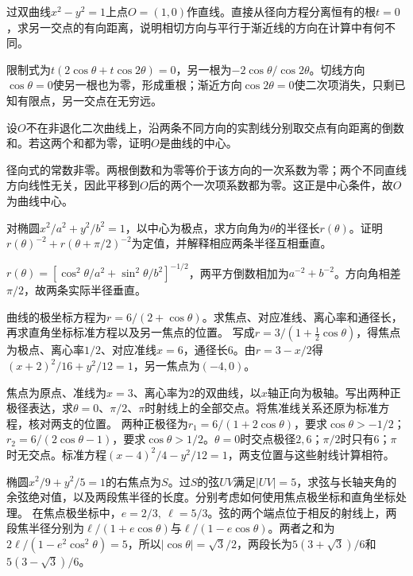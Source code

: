 过双曲线\(x^2-y^2=1\)上点\(O=(1,0)\)作直线。直接从径向方程分离恒有的根\(t=0\)，求另一交点的有向距离，说明相切方向与平行于渐近线的方向在计算中有何不同。
\par
\solutionanswer
限制式为\(t(2\cos\theta+t\cos2\theta)=0\)，另一根为\(-2\cos\theta/\cos2\theta\)。切线方向\(\cos\theta=0\)使另一根也为零，形成重根；渐近方向\(\cos2\theta=0\)使二次项消失，只剩已知有限点，另一交点在无穷远。


设\(O\)不在非退化二次曲线上，沿两条不同方向的实割线分别取交点有向距离的倒数和。若这两个和都为零，证明\(O\)是曲线的中心。
\par
\solutionanswer
径向式的常数非零。两根倒数和为零等价于该方向的一次系数为零；两个不同直线方向线性无关，因此平移到\(O\)后的两个一次项系数都为零。这正是中心条件，故\(O\)为曲线中心。


对椭圆\(x^2/a^2+y^2/b^2=1\)，以中心为极点，求方向角为\(\theta\)的半径长\(r(\theta)\)。证明\(r(\theta)^{-2}+r(\theta+\pi/2)^{-2}\)为定值，并解释相应两条半径互相垂直。
\par
\solutionanswer
\(r(\theta)=[\cos^2\theta/a^2+\sin^2\theta/b^2]^{-1/2}\)，两平方倒数相加为\(a^{-2}+b^{-2}\)。方向角相差\(\pi/2\)，故两条实际半径垂直。


曲线的极坐标方程为\(r=6/(2+\cos\theta)\)。求焦点、对应准线、离心率和通径长，再求直角坐标标准方程以及另一焦点的位置。
\solutionanswer
写成\(r=3/(1+\frac12\cos\theta)\)，得焦点为极点、离心率\(1/2\)、对应准线\(x=6\)，通径长\(6\)。由\(r=3-x/2\)得\((x+2)^2/16+y^2/12=1\)，另一焦点为\((-4,0)\)。


焦点为原点、准线为\(x=3\)、离心率为\(2\)的双曲线，以\(x\)轴正向为极轴。写出两种正极径表达，求\(\theta=0\)、\(\pi/2\)、\(\pi\)时射线上的全部交点。将焦准线关系还原为标准方程，核对两支的位置。
\solutionanswer
两种正极径为\(r_1=6/(1+2\cos\theta)\)，要求\(\cos\theta>-1/2\)；\(r_2=6/(2\cos\theta-1)\)，要求\(\cos\theta>1/2\)。\(\theta=0\)时交点极径\(2,6\)；\(\pi/2\)时只有\(6\)；\(\pi\)时无交点。标准方程\((x-4)^2/4-y^2/12=1\)，两支位置与这些射线计算相符。


椭圆\(x^2/9+y^2/5=1\)的右焦点为\(S\)。过\(S\)的弦\(UV\)满足\(|UV|=5\)，求弦与长轴夹角的余弦绝对值，以及两段焦半径的长度。分别考虑如何使用焦点极坐标和直角坐标处理。
\solutionanswer
在焦点极坐标中，\(e=2/3,\ \ell=5/3\)。弦的两个端点位于相反的射线上，两段焦半径分别为\(\ell/(1+e\cos\theta)\)与\(\ell/(1-e\cos\theta)\)。两者之和为\(2\ell/(1-e^2\cos^2\theta)=5\)，所以\(|\cos\theta|=\sqrt3/2\)，两段长为\(5(3+\sqrt3)/6\)和\(5(3-\sqrt3)/6\)。

